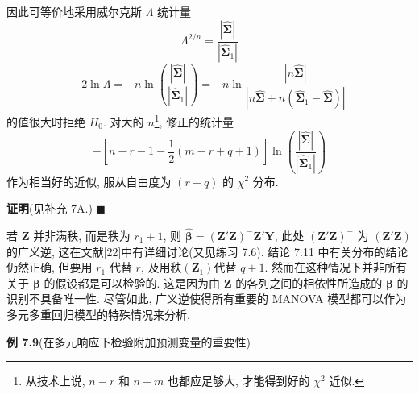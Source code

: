
因此可等价地采用威尔克斯 $\Lambda$ 统计量
\[
\Lambda^{2/n}=\frac{|\hat{\boldsymbol{\Sigma}}|}{|\hat{\boldsymbol{\Sigma}}_1|}
\]
\[
-2\ln\Lambda=-n\ln\left(\frac{|\hat{\boldsymbol{\Sigma}}|}{|\hat{\boldsymbol{\Sigma}}_1|}\right)
=-n\ln\frac{|n\hat{\boldsymbol{\Sigma}}|}{|n\hat{\boldsymbol{\Sigma}}+n(\hat{\boldsymbol{\Sigma}}_1-\hat{\boldsymbol{\Sigma}})|}
\]
的值很大时拒绝 $H_0$. 对大的 $n$\footnote{{\footnotesize 从技术上说, $n-r$ 和 $n-m$ 也都应足够大, 才能得到好的 $\chi^2$ 近似.}}, 修正的统计量
\[
-\left[n-r-1-\frac{1}{2}(m-r+q+1)\right]\ln\left(\frac{|\hat{\boldsymbol{\Sigma}}|}{|\hat{\boldsymbol{\Sigma}}_1|}\right)
\]
作为相当好的近似, 服从自由度为 $(r-q)$ 的 $\chi^2$ 分布.

\medskip
\noindent\textbf{证明}\quad (见补充 7A.) \hfill$\blacksquare$

若 $\mathbf{Z}$ 并非满秩, 而是秩为 $r_1+1$, 则 $\hat{\boldsymbol{\beta}}=(\mathbf{Z}'\mathbf{Z})^-\mathbf{Z}'\mathbf{Y}$, 此处 $(\mathbf{Z}'\mathbf{Z})^-$ 为 $(\mathbf{Z}'\mathbf{Z})$ 的广义逆, 这在文献[22]中有详细讨论(又见练习 7.6). 结论 7.11 中有关分布的结论仍然正确, 但要用 $r_1$ 代替 $r$, 及用秩$(\mathbf{Z}_1)$代替 $q+1$. 然而在这种情况下并非所有关于 $\boldsymbol{\beta}$ 的假设都是可以检验的. 这是因为由 $\mathbf{Z}$ 的各列之间的相依性所造成的 $\boldsymbol{\beta}$ 的识别不具备唯一性. 尽管如此, 广义逆使得所有重要的 MANOVA 模型都可以作为多元多重回归模型的特殊情况来分析.

\medskip
\noindent\textbf{例 7.9}\quad (在多元响应下检验附加预测变量的重要性)

